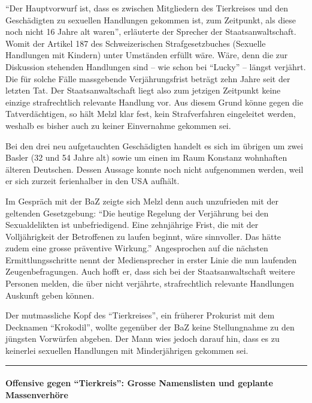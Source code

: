 ``Der Hauptvorwurf ist, dass es zwischen Mitgliedern des Tierkreises und
den Geschädigten zu sexuellen Handlungen gekommen ist, zum Zeitpunkt,
als diese noch nicht 16 Jahre alt waren'', erläuterte der Sprecher der
Staatsanwaltschaft. Womit der Artikel 187 des Schweizerischen
Strafgesetzbuches (Sexuelle Handlungen mit Kindern) unter Umständen
erfüllt wäre. Wäre, denn die zur Diskussion stehenden Handlungen sind --
wie schon bei ``Lucky'' -- längst verjährt. Die für solche Fälle
massgebende Verjährungsfrist beträgt zehn Jahre seit der letzten Tat.
Der Staatsanwaltschaft liegt also zum jetzigen Zeitpunkt keine einzige
strafrechtlich relevante Handlung vor. Aus diesem Grund könne gegen die
Tatverdächtigen, so hält Melzl klar fest, kein Strafverfahren
eingeleitet werden, weshalb es bisher auch zu keiner Einvernahme
gekommen sei.

Bei den drei neu aufgetauchten Geschädigten handelt es sich im übrigen
um zwei Basler (32 und 54 Jahre alt) sowie um einen im Raum Konstanz
wohnhaften älteren Deutschen. Dessen Aussage konnte noch nicht
aufgenommen werden, weil er sich zurzeit ferienhalber in den USA
aufhält.

Im Gespräch mit der BaZ zeigte sich Melzl denn auch unzufrieden mit der
geltenden Gesetzgebung: ``Die heutige Regelung der Verjährung bei den
Sexualdelikten ist unbefriedigend. Eine zehnjährige Frist, die mit der
Volljährigkeit der Betroffenen zu laufen beginnt, wäre sinnvoller. Das
hätte zudem eine grosse prä­ven­tive Wirkung.'' Angesprochen auf die
nächsten Ermittlungsschritte nennt der Mediensprecher in erster Linie
die nun laufenden Zeugenbefragungen. Auch hofft er, dass sich bei der
Staatsanwaltschaft weitere Personen melden, die über nicht verjährte,
strafrechtlich relevante Handlungen Auskunft geben können.

Der mutmassliche Kopf des ``Tierkreises'', ein früherer Prokurist mit
dem Decknamen ``Krokodil'', wollte gegenüber der BaZ keine Stellungnahme
zu den jüngsten Vorwürfen abgeben. Der Mann wies jedoch darauf hin, dass
es zu keinerlei sexuellen Handlungen mit Minderjährigen gekommen sei.

\begin{center}\rule{0.5\linewidth}{\linethickness}\end{center}

\hypertarget{offensive-gegen-tierkreis-grosse-namenslisten-und-geplante-massenverhuxf6re}{%
\paragraph{Offensive gegen ``Tierkreis'': Grosse Namenslisten und
geplante
Massenverhöre}\label{offensive-gegen-tierkreis-grosse-namenslisten-und-geplante-massenverhuxf6re}}

